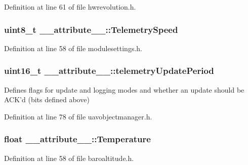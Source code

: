 \-Definition at line 61 of file hwrevolution.\-h.

\hypertarget{struct____attribute_____aaaeb6daf4aecff5b744dc58c64b05d62}{
\subsubsection[{\-Telemetry\-Speed}]{\setlength{\rightskip}{0pt plus 5cm}uint8\-\_\-t {\bf \-\_\-\-\_\-attribute\-\_\-\-\_\-\-::\-Telemetry\-Speed}}}\label{struct____attribute_____aaaeb6daf4aecff5b744dc58c64b05d62}


\-Definition at line 58 of file modulesettings.\-h.

\hypertarget{struct____attribute_____a07d69a32a8cbb34c8dc822e7bf30f73e}{
\subsubsection[{telemetry\-Update\-Period}]{\setlength{\rightskip}{0pt plus 5cm}uint16\-\_\-t {\bf \-\_\-\-\_\-attribute\-\_\-\-\_\-\-::telemetry\-Update\-Period}}}\label{struct____attribute_____a07d69a32a8cbb34c8dc822e7bf30f73e}
\-Defines flags for update and logging modes and whether an update should be \-A\-C\-K'd (bits defined above) 

\-Definition at line 78 of file uavobjectmanager.\-h.

\hypertarget{struct____attribute_____acc426b62d2b496740d85adea21c1f9eb}{
\subsubsection[{\-Temperature}]{\setlength{\rightskip}{0pt plus 5cm}float {\bf \-\_\-\-\_\-attribute\-\_\-\-\_\-\-::\-Temperature}}}\label{struct____attribute_____acc426b62d2b496740d85adea21c1f9eb}


\-Definition at line 58 of file baroaltitude.\-h.

